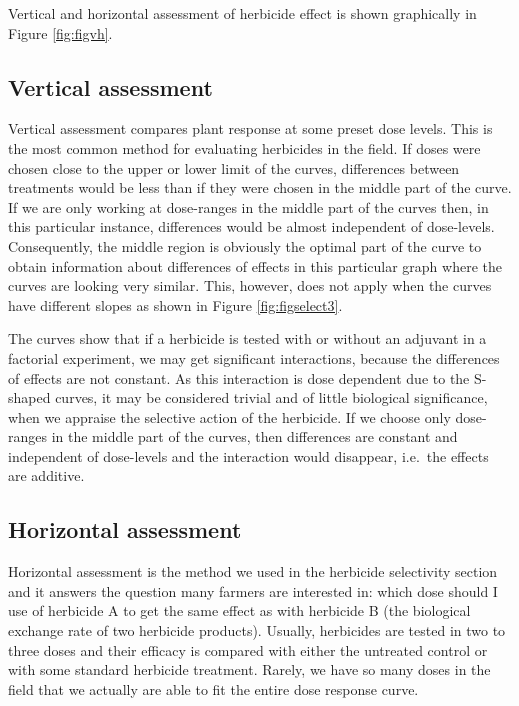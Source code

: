 \documentclass[letterpaper,]{book}
\begin{document}
Vertical and horizontal assessment of herbicide effect is shown graphically in Figure \ref{fig:figvh}.

\hypertarget{vertical-assessment}{%
\subsection{Vertical assessment}\label{vertical-assessment}}

Vertical assessment compares plant response at some preset dose levels. This is the most common method for evaluating herbicides in the field. If doses were chosen close to the upper or lower limit of the curves, differences between treatments would be less than if they were chosen in the middle part of the curve. If we are only working at dose-ranges in the middle part of the curves then, in this particular instance, differences would be almost independent of dose-levels. Consequently, the middle region is obviously the optimal part of the curve to obtain information about differences of effects in this particular graph where the curves are looking very similar. This, however, does not apply when the curves have different slopes as shown in Figure \ref{fig:figselect3}.

The curves show that if a herbicide is tested with or without an adjuvant in a factorial experiment, we may get significant interactions, because the differences of effects are not constant. As this interaction is dose dependent due to the S-shaped curves, it may be considered trivial and of little biological significance, when we appraise the selective action of the herbicide. If we choose only dose-ranges in the middle part of the curves, then differences are constant and independent of dose-levels and the interaction would disappear, i.e.~the effects are additive.

\hypertarget{horizontal-assessment}{%
\subsection{Horizontal assessment}\label{horizontal-assessment}}

Horizontal assessment is the method we used in the herbicide selectivity section and it answers the question many farmers are interested in: which dose should I use of herbicide A to get the same effect as with herbicide B (the biological exchange rate of two herbicide products). Usually, herbicides are tested in two to three doses and their efficacy is compared with either the untreated control or with some standard herbicide treatment. Rarely, we have so many doses in the field that we actually are able to fit the entire dose response curve.
\end{document}
